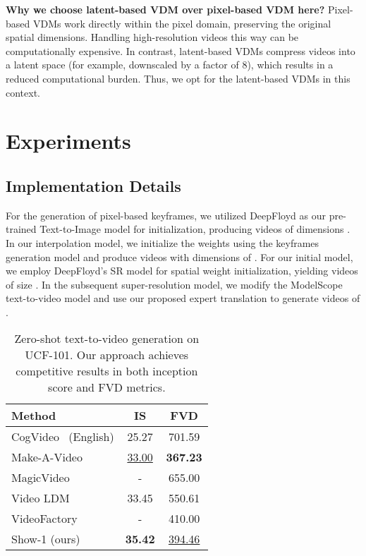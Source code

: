 \documentclass{article} \usepackage{iclr2024_conference,times}
\makeatletter
\let\oldfootnote\footnote
\def\footnote{\@ifstar\footnote@star\footnote@nostar}
\def\footnote@star#1{{\let\thefootnote\relax\footnotetext{#1}}}
\def\footnote@nostar{\oldfootnote}
\makeatother
\begin{document}
\noindent\textbf{Why we choose latent-based VDM over pixel-based VDM here?}  Pixel-based VDMs work directly within the pixel domain, preserving the original spatial dimensions. Handling high-resolution videos this way can be computationally expensive. In contrast, latent-based VDMs compress videos into a latent space (for example, downscaled by a factor of 8), which results in a reduced computational burden. Thus, we opt for the latent-based VDMs in this context.


\vspace{-2mm}

\section{Experiments}






\subsection{Implementation Details}

For the generation of pixel-based keyframes, we utilized DeepFloyd\footnote{https://github.com/deep-floyd/IF} as our pre-trained Text-to-Image model for initialization, producing videos of dimensions . In our interpolation model, we initialize the weights using the keyframes generation model and produce videos with dimensions of . For our initial  model, we employ DeepFloyd's SR model for spatial weight initialization, yielding videos of size . In the subsequent super-resolution model, we modify the ModelScope text-to-video model  and use our proposed expert translation to generate videos of .


\begin{table}[t]
\centering
\caption{Zero-shot text-to-video generation on UCF-101. Our approach achieves competitive results  in  both inception score and FVD metrics.}


\begin{tabular}{lcc}
\hline
Method              & IS     & FVD     \\
\midrule
CogVideo~\citep{hong2022cogvideo} (English) & 25.27 & 701.59 \\
Make-A-Video~\citep{singer2022make}         & \underline{33.00} & \textbf{367.23} \\
MagicVideo~\citep{zhou2022magicvideo}   & - & 655.00 \\
Video LDM~\citep{blattmann2023align}   & 33.45 & 550.61 \\
VideoFactory~\citep{wang2023videofactory}  & - & 410.00 \\
\hline

Show-1 (ours)      & \textbf{35.42} &  \underline{394.46} \\
\hline
\end{tabular}

\label{ucf1012}
\end{table}
\end{document}
